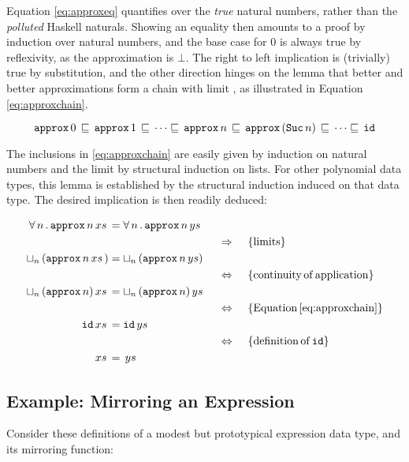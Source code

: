 Equation \ref{eq:approxeq} quantifies over the \emph{true} natural
numbers, rather than the \emph{polluted} Haskell naturals. Showing an
equality then amounts to a proof by induction over natural numbers,
and the base case for $0$ is always true by reflexivity, as the
approximation is $\bot$.
The right to left implication is (trivially) true by substitution, and
the other direction hinges on the lemma that better and better
approximations form a chain with limit , as illustrated in
Equation \ref{eq:approxchain}.

\begin{equation}
\label{eq:approxchain}
\hs{approx} \, 0 \,
   \sqsubseteq \,
\hs{approx} \, 1 \,
   \sqsubseteq \,
\cdots
   \sqsubseteq \,
\hs{approx} \, n \,
   \sqsubseteq \,
\hs{approx} \, (\hs{Suc} \, n) \,
   \sqsubseteq \,
\cdots
   \sqsubseteq \,
\hs{id}
\end{equation}

The inclusions in \ref{eq:approxchain} are easily given by induction
on natural numbers and the limit by structural induction on lists.
For other polynomial data types, this lemma is established by
the structural induction induced on that data type.
The desired implication is then readily deduced:

\begin{align*}
\xsys{\fa{n} \hs{approx} \, n}{}            \\
\descra{limits}                             \\
\xsys{\lub{n} \, (\hs{approx} \, n}{)}      \\
\desclra{continuity \, of \, application}   \\
\xsys{\lub{n} \, (\hs{approx} \, n)}{}      \\
\desclra{Equation \, \ref{eq:approxchain}} \\
\xsys{\hs{id}}{}                            \\
\desclra{definition \, of \, \hs{id}}       \\
\xsys{}{}                                   \\
\end{align*}

\subsection{Example: Mirroring an Expression}

Consider these definitions of a modest but prototypical expression
data type, and its mirroring function:

